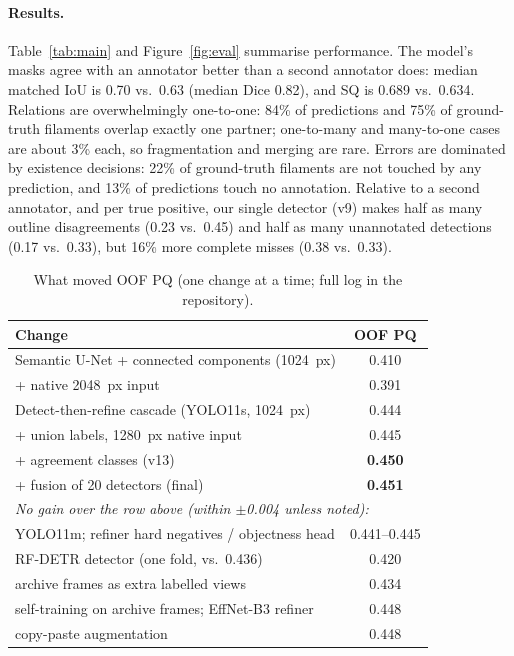 \documentclass[sigconf]{acmart}
\begin{document}
\paragraph{Results.} Table~\ref{tab:main} and Figure~\ref{fig:eval} summarise performance. The model's masks agree with an annotator better than a second annotator does: median matched IoU is 0.70 vs.\ 0.63 (median Dice 0.82), and SQ is 0.689 vs.\ 0.634. Relations are overwhelmingly one-to-one: 84\% of predictions and 75\% of ground-truth filaments overlap exactly one partner; one-to-many and many-to-one cases are about 3\% each, so fragmentation and merging are rare. Errors are dominated by existence decisions: 22\% of ground-truth filaments are not touched by any prediction, and 13\% of predictions touch no annotation. Relative to a second annotator, and per true positive, our single detector (v9) makes half as many outline disagreements (0.23 vs.\ 0.45) and half as many unannotated detections (0.17 vs.\ 0.33), but 16\% more complete misses (0.38 vs.\ 0.33).

\begin{table}[t]
  \caption{What moved OOF PQ (one change at a time; full log in the repository).}
  \label{tab:ablation}
  \small
  \begin{tabular}{lc}
    \toprule
    Change & OOF PQ \\
    \midrule
    Semantic U-Net + connected components (1024~px) & 0.410 \\
    \quad + native 2048~px input & 0.391 \\
    Detect-then-refine cascade (YOLO11s, 1024~px) & 0.444 \\
    \quad + union labels, 1280~px native input & 0.445 \\
    \quad + agreement classes (v13) & \textbf{0.450} \\
    \quad + fusion of 20 detectors (final) & \textbf{0.451} \\
    \midrule
    \multicolumn{2}{l}{\emph{No gain over the row above (within $\pm$0.004 unless noted):}} \\
    \quad YOLO11m; refiner hard negatives / objectness head & 0.441--0.445 \\
    \quad RF-DETR detector (one fold, vs.\ 0.436) & 0.420 \\
    \quad archive frames as extra labelled views & 0.434 \\
    \quad self-training on archive frames; EffNet-B3 refiner & 0.448 \\
    \quad copy-paste augmentation & 0.448 \\
    \bottomrule
  \end{tabular}
\end{table}
\end{document}
